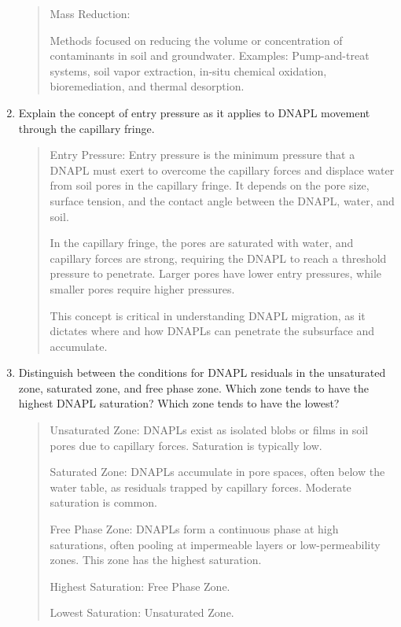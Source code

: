 \documentclass[12pt]{article}
\begin{document}
\begin{enumerate}
\begin{quote}
Mass Reduction:

Methods focused on reducing the volume or concentration of contaminants in soil and groundwater.
Examples: Pump-and-treat systems, soil vapor extraction, in-situ chemical oxidation, bioremediation, and thermal desorption.

\end{quote}
\clearpage

\item Explain the concept of entry pressure as it applies to DNAPL movement through the capillary fringe.

\begin{quote} 
Entry Pressure: Entry pressure is the minimum pressure that a DNAPL must exert to overcome the capillary forces and displace water from soil pores in the capillary fringe. It depends on the pore size, surface tension, and the contact angle between the DNAPL, water, and soil.

In the capillary fringe, the pores are saturated with water, and capillary forces are strong, requiring the DNAPL to reach a threshold pressure to penetrate. Larger pores have lower entry pressures, while smaller pores require higher pressures.

This concept is critical in understanding DNAPL migration, as it dictates where and how DNAPLs can penetrate the subsurface and accumulate.
\end{quote}
\clearpage

\item Distinguish between the conditions for DNAPL residuals in the unsaturated zone, saturated zone, and free phase zone.  Which zone tends to have the highest DNAPL saturation? Which zone tends to have the lowest?

\begin{quote} 
Unsaturated Zone: DNAPLs exist as isolated blobs or films in soil pores due to capillary forces. Saturation is typically low.

Saturated Zone: DNAPLs accumulate in pore spaces, often below the water table, as residuals trapped by capillary forces. Moderate saturation is common.

Free Phase Zone: DNAPLs form a continuous phase at high saturations, often pooling at impermeable layers or low-permeability zones. This zone has the highest saturation.

Highest Saturation: Free Phase Zone.

Lowest Saturation: Unsaturated Zone.
\end{quote}
\clearpage



\end{enumerate}
\end{document}
